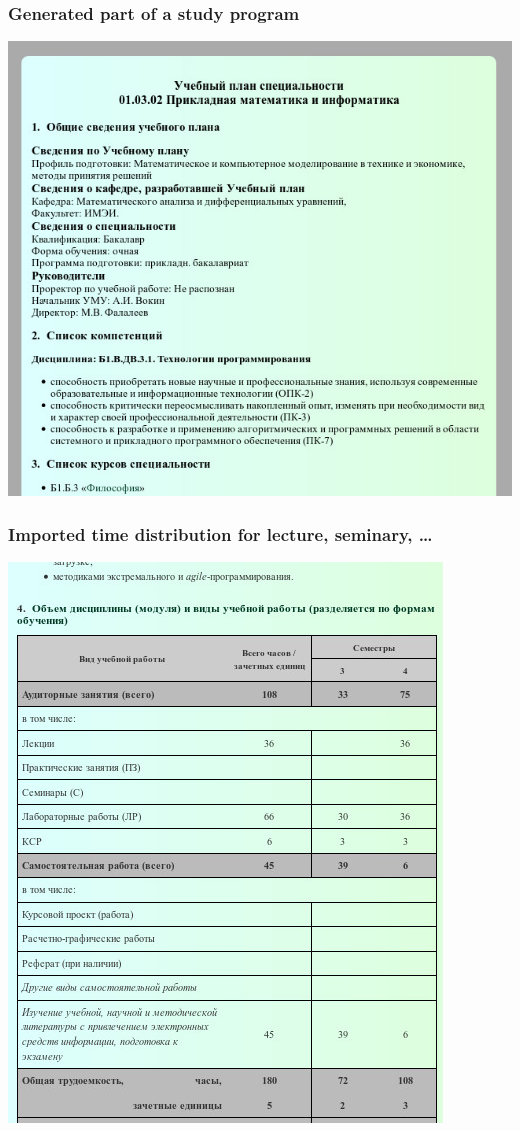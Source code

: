 \documentclass[10pt]{beamer}
\begin{document}
\begin{frame}
  \frametitle{Generated part of a study program}
   \begin{adjustwidth}{-2.5em}{-2.5em}
    \begin{center}
      \includegraphics[width=0.7\linewidth]{template-courses.jpg}
    \end{center}
  \end{adjustwidth}
\end{frame}
\begin{frame}
  \frametitle{Imported time distribution for lecture, seminary, \ldots}
   \begin{adjustwidth}{-2.5em}{-2.5em}
    \begin{center}
      \includegraphics[width=0.9\linewidth]{work-program-volume.jpg}
    \end{center}
  \end{adjustwidth}
\end{frame}
\end{document}
